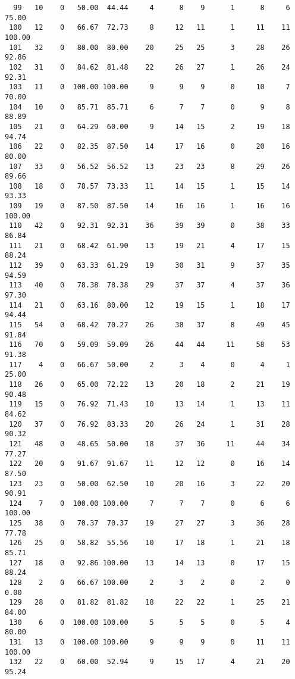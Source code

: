 \begin{verbatim}
  99   10    0   50.00  44.44     4      8    9      1      8     6    75.00
 100   12    0   66.67  72.73     8     12   11      1     11    11   100.00
 101   32    0   80.00  80.00    20     25   25      3     28    26    92.86
 102   31    0   84.62  81.48    22     26   27      1     26    24    92.31
 103   11    0  100.00 100.00     9      9    9      0     10     7    70.00
 104   10    0   85.71  85.71     6      7    7      0      9     8    88.89
 105   21    0   64.29  60.00     9     14   15      2     19    18    94.74
 106   22    0   82.35  87.50    14     17   16      0     20    16    80.00
 107   33    0   56.52  56.52    13     23   23      8     29    26    89.66
 108   18    0   78.57  73.33    11     14   15      1     15    14    93.33
 109   19    0   87.50  87.50    14     16   16      1     16    16   100.00
 110   42    0   92.31  92.31    36     39   39      0     38    33    86.84
 111   21    0   68.42  61.90    13     19   21      4     17    15    88.24
 112   39    0   63.33  61.29    19     30   31      9     37    35    94.59
 113   40    0   78.38  78.38    29     37   37      4     37    36    97.30
 114   21    0   63.16  80.00    12     19   15      1     18    17    94.44
 115   54    0   68.42  70.27    26     38   37      8     49    45    91.84
 116   70    0   59.09  59.09    26     44   44     11     58    53    91.38
 117    4    0   66.67  50.00     2      3    4      0      4     1    25.00
 118   26    0   65.00  72.22    13     20   18      2     21    19    90.48
 119   15    0   76.92  71.43    10     13   14      1     13    11    84.62
 120   37    0   76.92  83.33    20     26   24      1     31    28    90.32
 121   48    0   48.65  50.00    18     37   36     11     44    34    77.27
 122   20    0   91.67  91.67    11     12   12      0     16    14    87.50
 123   23    0   50.00  62.50    10     20   16      3     22    20    90.91
 124    7    0  100.00 100.00     7      7    7      0      6     6   100.00
 125   38    0   70.37  70.37    19     27   27      3     36    28    77.78
 126   25    0   58.82  55.56    10     17   18      1     21    18    85.71
 127   18    0   92.86 100.00    13     14   13      0     17    15    88.24
 128    2    0   66.67 100.00     2      3    2      0      2     0     0.00
 129   28    0   81.82  81.82    18     22   22      1     25    21    84.00
 130    6    0  100.00 100.00     5      5    5      0      5     4    80.00
 131   13    0  100.00 100.00     9      9    9      0     11    11   100.00
 132   22    0   60.00  52.94     9     15   17      4     21    20    95.24

\end{verbatim}
